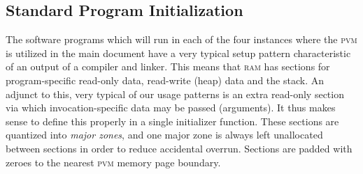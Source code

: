 \subsection{Standard Program Initialization}\label{sec:standardprograminit}
The software programs which will run in each of the four instances where the \textsc{pvm} is utilized in the main document have a very typical setup pattern characteristic of an output of a compiler and linker. This means that \textsc{ram} has sections for program-specific read-only data, read-write (heap) data and the stack. An adjunct to this, very typical of our usage patterns is an extra read-only section via which invocation-specific data may be passed (\ie arguments). It thus makes sense to define this properly in a single initializer function. These sections are quantized into \emph{major zones}, and one major zone is always left unallocated between sections in order to reduce accidental overrun. Sections are padded with zeroes to the nearest \textsc{pvm} memory page boundary.

